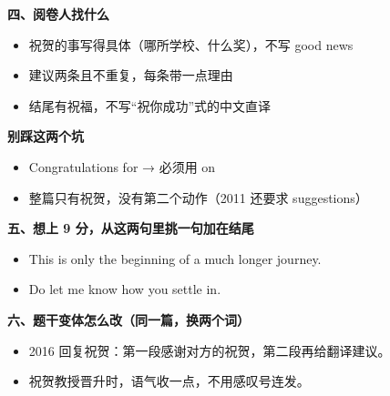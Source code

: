 \documentclass[11pt,a4paper]{ctexart}
\begin{document}
\vspace{5pt}
\noindent\begin{minipage}[t]{0.555\linewidth}
{\color{accent}\bfseries 四、阅卷人找什么}\par
{\footnotesize\begin{itemize}[leftmargin=1.2em,itemsep=1pt,topsep=1pt,parsep=0pt]\setlength{\leftmargin}{1.1em}
\item 祝贺的事写得具体（哪所学校、什么奖），不写 good news
\item 建议两条且不重复，每条带一点理由
\item 结尾有祝福，不写“祝你成功”式的中文直译
\end{itemize}}
\end{minipage}\hfill
\begin{minipage}[t]{0.415\linewidth}
{\color{hot}\bfseries 别踩这两个坑}\par
{\footnotesize\begin{itemize}[leftmargin=1.2em,itemsep=1pt,topsep=1pt,parsep=0pt]\setlength{\leftmargin}{1.1em}
\item Congratulations for → 必须用 on
\item 整篇只有祝贺，没有第二个动作（2011 还要求 suggestions）
\end{itemize}}
\end{minipage}\par

\vspace{6pt}
{\color{accent}\bfseries 五、想上 9 分，从这两句里挑一句加在结尾}\par
\vspace{2pt}
{\footnotesize
\begin{itemize}[leftmargin=1.2em,itemsep=1.5pt,topsep=1pt,parsep=0pt]
\item This is only the beginning of a much longer journey.
\item Do let me know how you settle in.
\end{itemize}}\par

\vspace{6pt}
{\color{accent}\bfseries 六、题干变体怎么改（同一篇，换两个词）}\par
\vspace{2pt}
{\footnotesize
\begin{itemize}[leftmargin=1.2em,itemsep=1.5pt,topsep=1pt,parsep=0pt]
\item 2016 回复祝贺：第一段感谢对方的祝贺，第二段再给翻译建议。
\item 祝贺教授晋升时，语气收一点，不用感叹号连发。
\end{itemize}}\par
\end{document}
